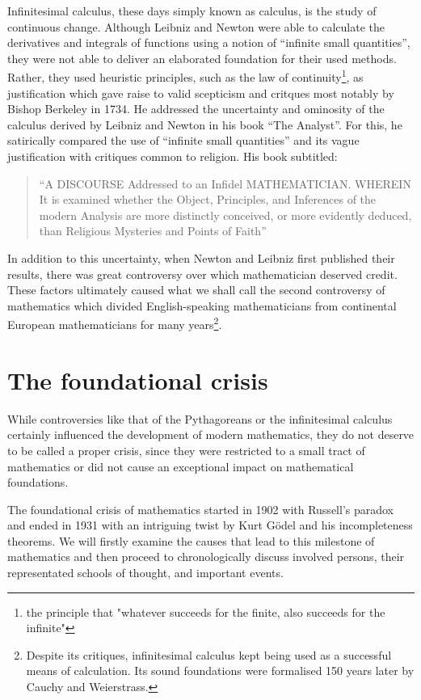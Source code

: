 \documentclass[hidelinks]{article}
\theoremstyle{plain}
\theoremstyle{definition}
\theoremstyle{rem}
\begin{document}
Infinitesimal calculus, these days simply known as calculus, is the study of continuous change. Although Leibniz and Newton were able to calculate the derivatives and integrals of functions using a notion of ``infinite small quantities'', they were not able to deliver an elaborated foundation for their used methods. Rather, they used heuristic principles, such as the law of continuity\footnote{the principle that "whatever succeeds for the finite, also succeeds for the infinite"}, as justification which gave raise to valid scepticism and critques most notably by Bishop Berkeley in 1734. He addressed the uncertainty and ominosity of the calculus derived by Leibniz and Newton in his book ``The Analyst''. For this, he satirically compared the use of ``infinite small quantities'' and its vague justification with critiques common to religion. His book subtitled:
\begin{quote}
	``A DISCOURSE Addressed to an Infidel MATHEMATICIAN\@. WHEREIN It is examined whether the Object, Principles, and Inferences of the modern Analysis are more distinctly conceived, or more evidently deduced, than Religious Mysteries and Points of Faith''
\end{quote}
In addition to this uncertainty, when Newton and Leibniz first published their results, there was great controversy over which mathematician deserved credit. These factors ultimately caused what we shall call the second controversy of mathematics which divided English-speaking mathematicians from continental European mathematicians for many years\footnote{Despite its critiques, infinitesimal calculus kept being used as a successful means of calculation. Its sound foundations were formalised 150 years later by Cauchy and Weierstrass.}.

\section{The foundational crisis}
While controversies like that of the Pythagoreans or the infinitesimal calculus certainly influenced the development of modern mathematics, they do not deserve to be called a proper crisis, since they were restricted to a small tract of mathematics or did not cause an exceptional impact on mathematical foundations.

The foundational crisis of mathematics started in 1902 with Russell's paradox and ended in 1931 with an intriguing twist by Kurt Gödel and his incompleteness theorems.
We will firstly examine the causes that lead to this milestone of mathematics and then proceed to chronologically discuss involved persons, their representated schools of thought, and important events.
\end{document}
